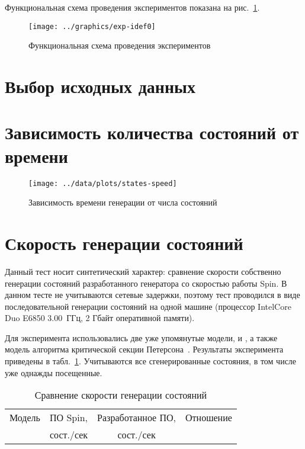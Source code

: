 Функциональная схема проведения экспериментов показана на рис.~\ref{fig:exp-idef0}.

\begin{figure}[ht]
  \centering
  \texttt{[image: ../graphics/exp-idef0]}
  \caption{Функциональная схема проведения экспериментов}
  \label{fig:exp-idef0}
\end{figure}

\section{Выбор исходных данных}
\label{sec:experiment-models}

\section{Зависимость количества состояний от времени}
\label{sec:space-time}

\begin{figure}[ht]
  \centering
  \texttt{[image: ../data/plots/states-speed]}
  \caption{Зависимость времени генерации от числа состояний}
  \label{fig:states-speed}
\end{figure}

\section{Скорость генерации состояний}
\label{sec:stategen-speed}

Данный тест носит синтетический характер: сравнение скорости собственно генерации
состояний разработанного генератора со скоростью работы Spin. В данном тесте не
учитываются сетевые задержки, поэтому тест проводился в виде последовательной генерации
состояний на одной машине (процессор Intel\regsign Core Duo E6850 3.00~ГГц, 2
Гбайт оперативной памяти).

Для эксперимента использовались две уже упомянутые модели,  и ,
а также модель алгоритма критической секции Петерсона~\cite{SPIN}. Результаты эксперимента
приведены в табл.~\ref{tab:stategen-speed}. Учитываются все сгенерированные состояния, в
том числе уже однажды посещенные.

\begin{table}[ht]
  \centering
  \caption{Сравнение скорости генерации состояний}
  \begin{tabular}{cccc}
    \hline
    Модель & ПО Spin,   & Разработанное ПО, & Отношение \\
           &  сост./сек &  сост./сек        &           \\
    \hline
    
    \hline
  \end{tabular}
  \label{tab:stategen-speed}
\end{table}


